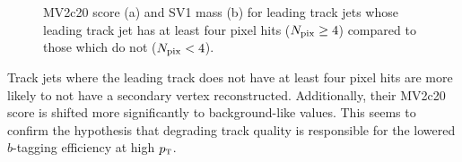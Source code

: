 \begin{figure}[h!]
\begin{subfigure}[t]{0.5\textwidth}
        \caption{}
    \end{subfigure}

   \caption{MV2c20 score (a) and SV1 mass (b) for leading track jets whose leading track jet has at least four pixel hits ($N_{\rm pix} \geq 4$) compared to those which do not ($N_{\rm pix} < 4$).}
  \label{fig:Nph_MV2}
\end{figure}
%
Track jets where the leading track does not have at least four pixel hits are more likely to not have a secondary vertex reconstructed. Additionally, their MV2c20 score is shifted more significantly to background-like values. This seems to confirm the hypothesis that degrading track quality is responsible for the lowered $b$-tagging efficiency at high $p_{\textrm{\footnotesize\sc t}}$. 




